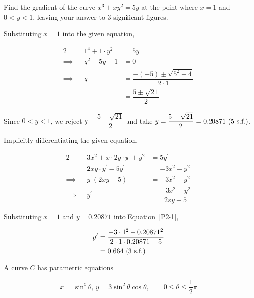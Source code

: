 \documentclass{echw}
\begin{document}

    \problem{}
        Find the gradient of the curve $x^3 + xy^2 = 5y$ at the point where $x=1$ and $0 < y < 1$, leaving your answer to 3 significant figures.

    \solution
        Substituting $x=1$ into the given equation,

        \begin{alignat*}{2}
            &&1^4 + 1\cdot y^2 &= 5y\\
            \implies&&y^2-5y+1&=0\\
            \implies&&y &= \dfrac{-(-5)\pm\sqrt{5^2-4}}{2\cdot1}\\
            && &= \dfrac{5\pm\sqrt{21}}2
        \end{alignat*}

        Since $0 < y < 1$, we reject $y = \dfrac{5+\sqrt{21}}2$ and take $y = \dfrac{5-\sqrt{21}}2 = 0.20871 \text{ (5 s.f.)}$.

        Implicitly differentiating the given equation,

        \begin{alignat}{2}
            &&3x^2+x\cdot2y\cdot y^\prime + y^2 &= 5y^\prime \nonumber\\
            &&2xy\cdot y^\prime - 5y^\prime &= -3x^2-y^2 \nonumber\\
            \implies&&y^\prime(2xy-5)&=-3x^2-y^2 \nonumber\\
            \implies&&y^\prime &= \dfrac{-3x^2-y^2}{2xy-5}\label{P2-1}
        \end{alignat}

        Substituting $x=1$ and $y=0.20871$ into Equation~\ref{P2-1}, 

        \begin{align*}
            y^\prime &= \dfrac{-3\cdot1^2-0.20871^2}{2\cdot 1 \cdot 0.20871-5}\\
            &= 0.664 \text{ (3 s.f.)}
        \end{align*}


    \problem{}
        A curve $C$ has parametric equations

        \begin{equation*}
            x = \sin^3 \theta, \, y = 3 \sin^2 \theta \cos \theta, \qquad 0 \leq \theta \leq \dfrac12 \pi
        \end{equation*}
\end{document}
